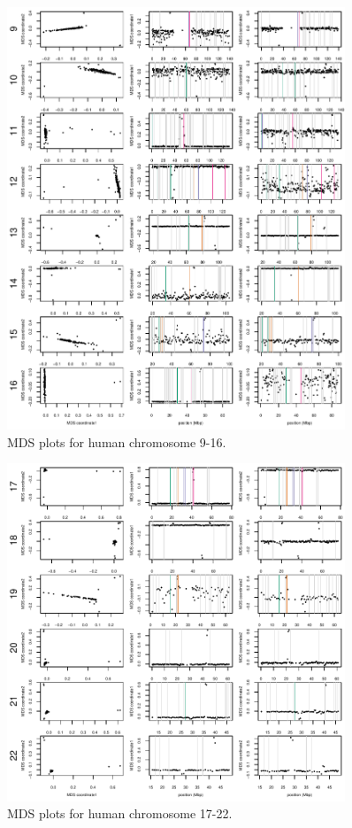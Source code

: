 \documentclass[11pt, oneside]{article}   	%
\begin{document}
\begin{figure}
    \begin{center}
       \includegraphics[width=0.9\textwidth]{FigS_human_MDS12_chr9_16_all_valid_and_pre}
    \end{center}
    \caption{
        MDS plots for human chromosome 9-16.
        \label{sfig:mds12_chr9_16_human}
    }
\end{figure}

\begin{figure}
    \begin{center}
       \includegraphics[width=0.9\textwidth]{FigS_human_MDS12_chr17_22_all_valid_and_pre}
    \end{center}
    \caption{
        MDS plots for human chromosome 17-22.
        \label{sfig:mds12_chr17_22_human}
    }
\end{figure}
\end{document}
